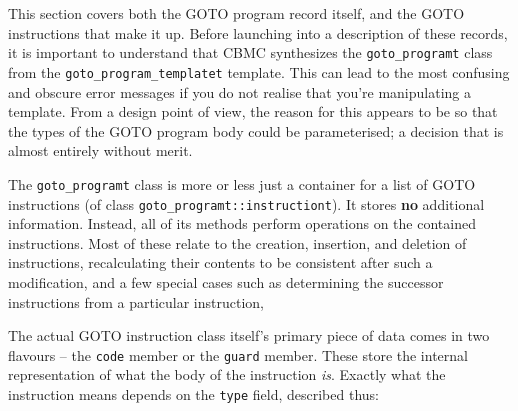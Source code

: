 \documentclass{article}
\begin{document}
This section covers both the GOTO program record itself, and the GOTO
instructions that make it up. Before launching into a description of these
records, it is important to understand that CBMC synthesizes the
\texttt{goto\_programt} class from the \texttt{goto\_program\_templatet}
template. This can lead to the most confusing and obscure error messages
if you do not realise that you're manipulating a template. From a design
point of view, the reason for this appears to be so that the types of
the GOTO program body could be parameterised; a decision that is almost
entirely without merit.

The \texttt{goto\_programt} class is more or less just a container for a
list of GOTO instructions (of class \texttt{goto\_programt::instructiont}).
It stores \textbf{no} additional information. Instead, all of its methods
perform operations on the contained instructions. Most of these relate
to the creation, insertion, and deletion of instructions, recalculating
their contents to be consistent after such a modification, and a few
special cases such as determining the successor instructions from a
particular instruction,

The actual GOTO instruction class itself's primary piece of data comes in
two flavours -- the \texttt{code} member or the \texttt{guard} member.
These store the internal representation of what the body of the instruction
\textit{is}. Exactly what the instruction means depends on the \texttt{type}
field, described thus:
\end{document}
